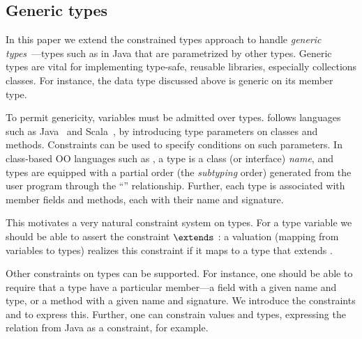 \subsection{Generic types}

In this paper we extend the constrained types approach to handle
\emph{generic
types}~\cite{clu,ada,GJ,java-popl97,thorup97,Java3,csharp-generics}---types
such as  in Java that are parametrized by other
types. Generic types are vital for implementing type-safe, reusable
libraries, especially collections classes. For instance, the data type
 discussed above is generic on its member type.

To permit genericity, variables  must be admitted over types.
\Xten{} follows languages such as Java~\cite{Java3} and
Scala~\cite{scala}, by introducing type parameters on classes
and methods.
Constraints can be used to specify conditions on such parameters.
In class-based OO languages such as \Java, 
a type is a class (or interface) \emph{name}, and 
types are equipped with a partial
order (the \emph{subtyping} order) generated from the user program
through the ``'' relationship.  Further, each type is
associated with member fields and methods, each with their
name and signature.

This motivates a very natural constraint system on types.  For a type
variable  we should be able to assert the constraint 
$\extends$ : a valuation (mapping from variables to types) realizes
this constraint if it maps  to a type that extends .


Other constraints on
types can be supported.  For instance, one should
be able to require that a type have a
particular member---a field with a given name and type, or a method
with a given name and signature. We introduce the constraints 
   and    to express this.
Further, one can constrain values and types, expressing the
 relation from Java as a constraint, for example.

